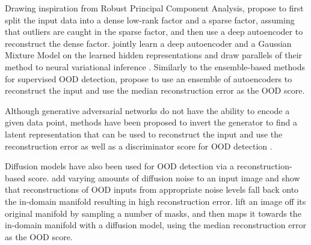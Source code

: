 Drawing inspiration from Robust Principal Component Analysis, \textcite{zhou_anomaly_2017} propose to first split the input data into a dense low-rank factor and a sparse factor, assuming that outliers are caught in the sparse factor, and then use a deep autoencoder to reconstruct the dense factor. 
\textcite{zong_deep_2018} jointly learn a deep autoencoder and a Gaussian Mixture Model on the learned hidden representations and draw parallels of their method to neural variational inference \cite{mnih_neural_2014}. 
Similarly to the ensemble-based methods for supervised OOD detection, \textcite{chen_outlier_2017} propose to use an ensemble of autoencoders to reconstruct the input and use the median reconstruction error as the OOD score. 

Although generative adversarial networks do not have the ability to encode a given data point, methods have been proposed to invert the generator to find a latent representation that can be used to reconstruct the input and use the reconstruction error as well as a discriminator score for OOD detection \cite{schlegl_unsupervised_2017,li_madgan_2019}. 

Diffusion models have also been used for OOD detection via a reconstruction-based score. \textcite{graham_denoising_2023} add varying amounts of diffusion noise to an input image and show that reconstructions of OOD inputs from appropriate noise levels fall back onto the in-domain manifold resulting in high reconstruction error. 
\textcite{liu_unsupervised_2023a} lift an image off its original manifold by sampling a number of masks, and then maps it towards the in-domain manifold with a diffusion model, using the median reconstruction error as the OOD score.



